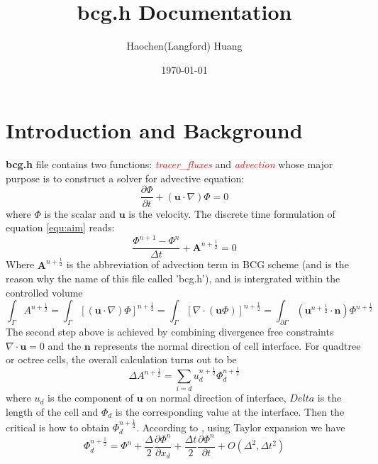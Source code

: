 \documentclass[a4paper]{article}
\title{bcg.h Documentation}
\author{Haochen(Langford) Huang}
\date{\today}
\begin{document}
\maketitle

\section{Introduction and Background}\label{sec:intro}
\textbf{bcg.h} file contains two functions: \textcolor{red}{\emph{tracer\_fluxes}} and \textcolor{red}{\emph{advection}} whose major purpose is to construct a solver for advective equation:
\begin{equation}
  \frac{\partial \Phi}{\partial t} + ( \mathbf{u} \cdot \nabla)\Phi = 0\label{equ:aim}
\end{equation}
where $\Phi$ is the scalar and $ \mathbf{u}$ is the velocity. The discrete time formulation of equation \ref{equ:aim} reads:
\begin{equation}
  \frac{\Phi^{n+1}-\Phi^{n}}{\Delta t} + \mathbf{A}^{n+\frac{1}{2}} = 0 \label{equ:general}
\end{equation}
Where $ \mathbf{A}^{n+ \frac{1}{2}}$ is the abbreviation of advection term in BCG\cite{bell1989second,popinet2003gerris} scheme (and is the reason why the name of this file called 'bcg.h'), and is intergrated within the controlled volume
\begin{equation}
  \int_{\Gamma} A^{n+ \frac{1}{2}} = \int_{\Gamma} [( \mathbf{u}\cdot \nabla)\Phi]^{n+ \frac{1}{2}} = \int_{\Gamma} [\nabla\cdot( \mathbf{u} \Phi)]^{n+ \frac{1}{2}} = \int_{\partial \Gamma} ( \mathbf{u}^{n + \frac{1}{2}} \cdot \mathbf{n}) \Phi^{n+ \frac{1}{2}}
\end{equation}
The second step above is achieved by combining divergence free constraints $\nabla\cdot \mathbf{u}=0$ and the $ \mathbf{n}$ represents the normal direction of cell interface. For quadtree or octree cells, the overall calculation turns out to be
\begin{equation}
  \Delta A^{n+ \frac{1}{2}} = \sum_{i=d} u_d^{n+ \frac{1}{2}}\Phi_d^{n + \frac{1}{2}} 
\end{equation}
where $u_d$ is the component of $ \mathbf{u}$ on normal direction of interface, $Delta$ is the length of the cell and $\Phi_d$ is the corresponding value at the interface. Then the critical is how to obtain $\Phi_d^{n + \frac{1}{2}}$. According to \cite{popinet2003gerris}, using Taylor expansion we have
\begin{equation}
  \Phi^{n+ \frac{1}{2}}_d = \Phi^n+ \frac{\Delta}{2} \frac{\partial \Phi^n}{\partial x_d} + \frac{\Delta t}{2} \frac{\partial \Phi^n}{\partial t} + O(\Delta^2,\Delta t^2)
\end{equation}
\end{document}
